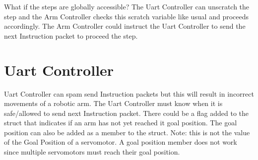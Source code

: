 \documentclass[12pt]{article}
\begin{document}
What if the steps are globally accessible?
The Uart Controller can unscratch the step and the Arm Controller checks this scratch variable like usual and proceeds accordingly.
The Arm Controller could instruct the Uart Controller to send the next Instruction packet to proceed the step.
\section{Uart Controller}
Uart Controller can spam send Instruction packets but this will result in incorrect movements of a robotic arm.
The Uart Controller must know when it is safe/allowed to send next Instruction packet.
There could be a flag added to the struct that indicates if an arm has not yet reached it goal position.
The goal position can also be added as a member to the struct.
Note: this is not the value of the Goal Position of a servomotor.
A goal position member does not work since multiple servomotors must reach their goal position.
\end{document}
